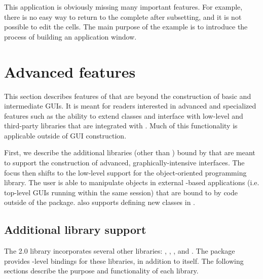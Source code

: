 \documentclass[article,shortnames]{jss}
\begin{document}
This application is obviously missing many important features. For
example, there is no easy way to return to the complete
 after subsetting, and
it is not possible to edit the cells. The main purpose of the example
is to introduce the process of building an application window.

\section{Advanced features}

This section describes features of  that are beyond the
construction of basic and intermediate GUIs. It is meant for readers
interested in advanced and specialized  features such as
the ability to extend  classes and interface with low-level
and third-party libraries that are integrated with . Much of
this functionality is applicable outside of GUI construction.


First, we describe the additional libraries (other than )
bound by
 that are meant to support the construction of advanced,
graphically-intensive interfaces. The focus then shifts to the
low-level support for the  object-oriented programming
library. The  user is able to manipulate objects in
external -based applications (i.e. top-level GUIs running
within the same  session) that are bound to 
by code
outside of the  package.  also supports defining
new  classes in .

\subsection{Additional library support}

The  2.0 library incorporates several other libraries:
, , ,  and . 
The  package provides -level bindings for
these libraries, in addition to  itself. The following
sections describe the purpose and functionality of each library.

\subsubsection[Cairo]{} 
\end{document}

